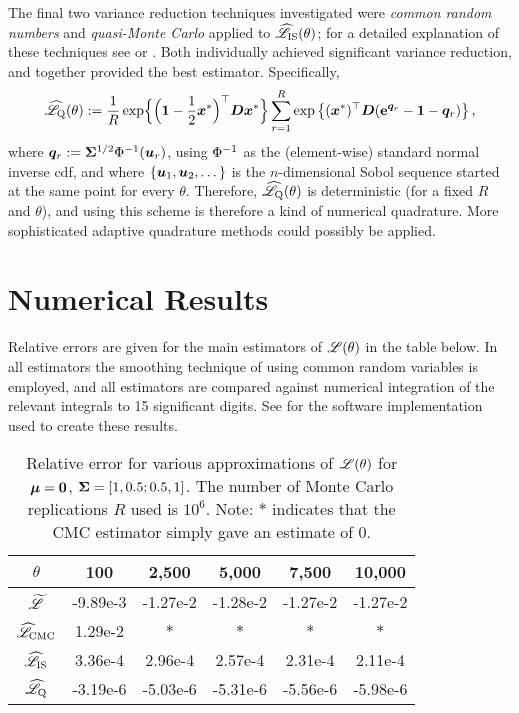 The final two variance reduction techniques investigated were \emph{common
  random numbers} and \emph{quasi-Monte Carlo} applied to
$\widehat{\mathscr{L}}_{\mathrm{IS}}(\theta)$; for a detailed explanation of
these techniques see \cite{glasserman2003monte} or
\cite{asmussen2007stochastic}. Both individually achieved significant variance
reduction, and together provided the best estimator. Specifically,
\[ \widehat{\mathscr{L}}_{\mathrm{Q}}(\theta) := \frac{1}{R} \exp\Bigl\{ \Bigl(\bm{1} - \frac12 \bm{x}^* \Bigr)^\top \bm{D} \bm{x}^* \Bigr\}  \sum_{r=1}^R \exp\left\{ (\bm{x}^*)^\top \bm{D} (\text{\bf{e}}^{\bm{q}_r} - \bm{1} - \bm{q}_r) \right\}, \]
where $\bm{q}_r := \bm{\Sigma}^{1/2} \mathrm{\bm{\Phi}}^{-1}(\bm{u}_r)$, using
$\mathrm{\bm{\Phi}}^{-1}$ as the (element-wise) standard normal inverse
cdf, and where $\{\bm{u}_1, \bm{u}_2, \dots\}$ is the $n$-dimensional Sobol
sequence started at the same point for every $\theta$. Therefore,
$\widehat{\mathscr{L}}_{\mathrm{Q}}(\theta)$ is deterministic (for a fixed $R$
and $\theta$), and using this scheme is therefore a kind of numerical
quadrature. More sophisticated adaptive quadrature methods could possibly be
applied.

\section{Numerical Results}\label{S:Num}

Relative errors are given for the main estimators of $\mathscr{L}(\theta)$ in the
table below. In all estimators the smoothing technique of using common random
variables is employed, and all estimators are compared against numerical
integration of the relevant integrals to 15 significant digits. See \cite{CodeLaplaceSLN} for the software implementation used to create these results.

\begin{table}[ht]
\centering
\caption{Relative error for various approximations of $\mathscr{L}(\theta)$ for
  $\bm{\mu} = \bm{0}$, $\bm{\Sigma} = [1, 0.5; 0.5, 1]$. The number of Monte Carlo
  replications $R$ used is $10^6$. Note: $*$ indicates that the CMC estimator
  simply gave an estimate of 0.}
\vspace{3pt}
\begin{tabular}{cccccc}
\hline
{$\theta$}& 100 & 2{,}500 & 5{,}000 & 7{,}500 & 10{,}000 \\ \hline
$\widetilde{\Laplace}$\raisebox{1pt}{\vphantom{$\widetilde{\Laplace}$}}&
{-9.89e-3 }&{-1.27e-2 }&{-1.28e-2 }&{-1.27e-2 }&{-1.27e-2 }\\
{$\widehat{\mathscr{L}}_{\mathrm{CMC}}$}&
{1.29e-2 }&{$*$}&{$*$}&{$*$}&{$*$} \\
{$\widehat{\mathscr{L}}_{\mathrm{IS}}$}&
{3.36e-4 }&{2.96e-4 }&{2.57e-4 }&{2.31e-4 }&{2.11e-4 } \\
{$\widehat{\mathscr{L}}_{\mathrm{Q}}$}&
{-3.19e-6 }&{-5.03e-6 }&{-5.31e-6}&{-5.56e-6 }&{-5.98e-6 } \\ \hline
\end{tabular}
\end{table}

